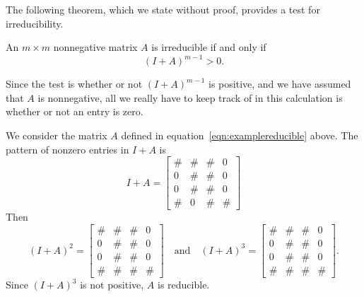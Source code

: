 The following theorem, which we state without proof, provides
a test for irreducibility.
\begin{theorem}
\label{thm:irredtest}
An $m\times m$ nonnegative matrix $A$ is 
irreducible if and only if
\begin{equation}
   (I+A)^{m-1} > 0.
\end{equation}
\end{theorem}
Since the test is whether or not $(I+A)^{m-1}$ is positive, and we have assumed that
$A$ is nonnegative, all we really have to keep track of in this calculation is
whether or not an entry is zero.
\begin{xexample}
We consider the matrix $A$ defined in equation~\eqref{eqn:examplereducible}
above.  The pattern of nonzero entries in $I+A$ is
\begin{equation}
  I+A = \begin{bmatrix}
            \# & \# & \# & 0 \\
            0  & \# & \# & 0 \\
            0 & \# & \# & 0 \\
            \# & 0 & \# & \#
      \end{bmatrix}
\end{equation}
Then
\begin{equation}
  (I+A)^2 = 
      \begin{bmatrix}
            \# & \# & \# & 0 \\
            0  & \# & \# & 0 \\
            0 & \# & \# & 0 \\
            \# & \# & \# & \#
      \end{bmatrix}
    \quad \textrm{and} \quad
  (I+A)^3 = 
      \begin{bmatrix}
            \# & \# & \# & 0 \\
            0  & \# & \# & 0 \\
            0 & \# & \# & 0 \\
            \# & \# & \# & \#
      \end{bmatrix}.
\end{equation}
Since $(I+A)^3$ is not positive, $A$ is reducible.


\end{xexample}
